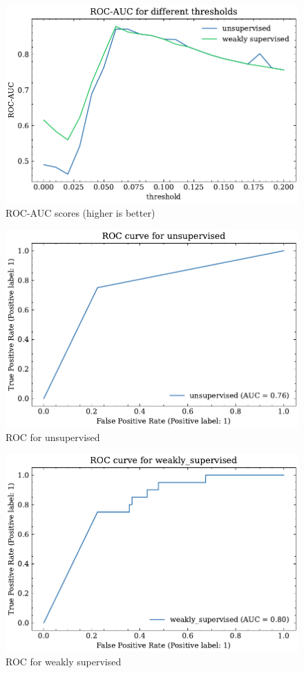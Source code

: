 \begin{figure}[h]
  \centering
  \includegraphics{5Results/figs/bsle/roc_auc_score_for_thresholds.pdf}
  \caption{ROC-AUC scores (higher is better)}
\end{figure}
\begin{figure}[h]
  \centering
  \includegraphics{5Results/figs/bsle/roc_auc_unsupervised.pdf}
  \caption{ROC for unsupervised}
\end{figure}
\begin{figure}[h]
  \centering
  \includegraphics{5Results/figs/bsle/roc_auc_weakly_supervised.pdf}
  \caption{ROC for weakly supervised
  }
\end{figure}
